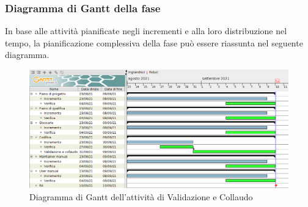 \subsubsection{Diagramma di Gantt della fase}
In base alle attività pianificate negli incrementi e alla loro distribuzione nel tempo, la pianificazione complessiva della fase può essere riassunta nel seguente diagramma.
\begin{figure}[!ht]
    \caption{Diagramma di Gantt dell'attività di Validazione e Collaudo}
    \vspace{5px}
    \includegraphics[scale=0.25]{../../../Images/Diagrammi/Gantt/validazione_v3.png}
    \centering
\end{figure}